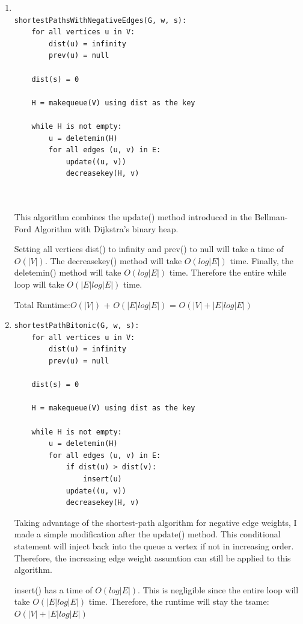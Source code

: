 \documentclass[11pt]{article}
\newenvironment{qparts}{\begin{enumerate}[{(}a{)}]}{\end{enumerate}}
\begin{document}
\begin{qparts}
\item
\begin{lstlisting}

shortestPathsWithNegativeEdges(G, w, s):
	for all vertices u in V:
		dist(u) = infinity
 		prev(u) = null

	dist(s) = 0
 
	H = makequeue(V) using dist as the key

	while H is not empty:		
		u = deletemin(H)
		for all edges (u, v) in E:
			update((u, v))
			decreasekey(H, v)
		
		
\end{lstlisting}
This algorithm combines the update() method introduced in the Bellman-Ford Algorithm with Dijkstra's binary heap. 

Setting all vertices dist() to infinity and prev() to null will take a time of $O(|V|)$. The decreasekey() method will take $O(log|E|)$ time. Finally, the deletemin() method will take $O(log|E|)$ time. Therefore the entire while loop will take $O(|E|log|E|)$ time.

Total Runtime:$O(|V|)$ + $O(|E|log|E|)$ = $O(|V| + |E|log|E|)$

\item
\begin{lstlisting}
shortestPathBitonic(G, w, s):
	for all vertices u in V:
		dist(u) = infinity
 		prev(u) = null

	dist(s) = 0
 
	H = makequeue(V) using dist as the key

	while H is not empty:
		u = deletemin(H)
		for all edges (u, v) in E:
			if dist(u) > dist(v):
				insert(u) 
			update((u, v))
			decreasekey(H, v)

\end{lstlisting}
Taking advantage of the shortest-path algorithm for negative edge weights, I made a simple modification after the update() method. This conditional statement will inject back into the queue a vertex if not in increasing order. Therefore, the increasing edge weight assumtion can still be applied to this algorithm.

insert() has a time of $O(log|E|)$. This is negligible since the entire loop will take $O(|E|log|E|)$ time. Therefore, the runtime will stay the tsame: $O(|V| + |E|log|E|)$





\end{qparts}
\end{document}
